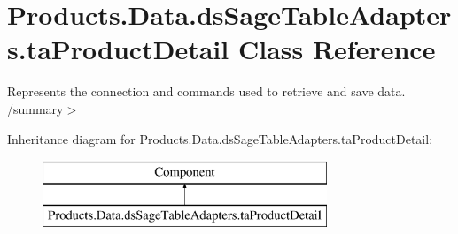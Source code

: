 \hypertarget{class_products_1_1_data_1_1ds_sage_table_adapters_1_1ta_product_detail}{}\section{Products.\+Data.\+ds\+Sage\+Table\+Adapters.\+ta\+Product\+Detail Class Reference}
\label{class_products_1_1_data_1_1ds_sage_table_adapters_1_1ta_product_detail}


Represents the connection and commands used to retrieve and save data. /summary$>$  


Inheritance diagram for Products.\+Data.\+ds\+Sage\+Table\+Adapters.\+ta\+Product\+Detail\+:\begin{figure}[H]
\begin{center}
\leavevmode
\includegraphics[height=2.000000cm]{class_products_1_1_data_1_1ds_sage_table_adapters_1_1ta_product_detail}
\end{center}
\end{figure}
